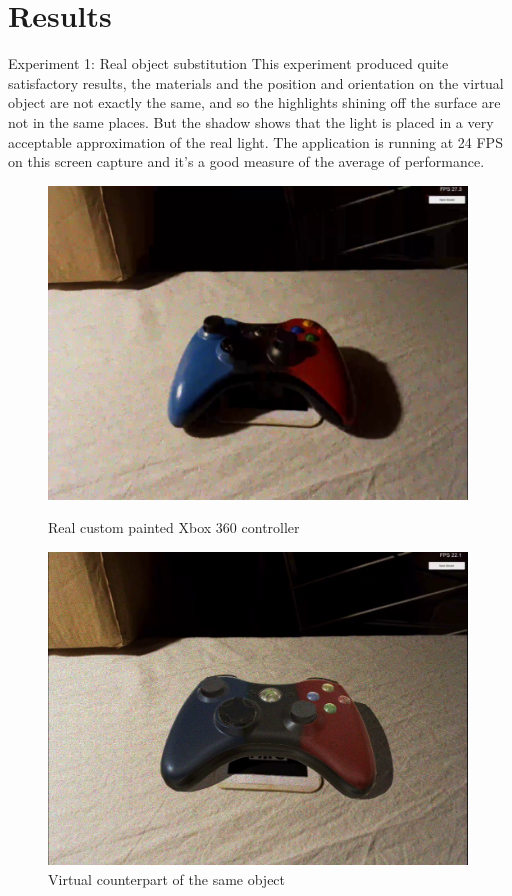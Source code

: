\section{Results}

Experiment 1: Real object substitution\newline  
This experiment produced quite satisfactory results, the materials and the position and orientation on the virtual object are not exactly the same, and so the highlights shining off the surface are not in the same places. But the shadow shows that the light is placed in a very acceptable approximation of the real light. The application is running at 24 FPS on this screen capture and it's a good measure of the average of performance. 
\begin{figure}[H]
    \centering
    \begin{minipage}{0.475\textwidth}
        \centering
        \includegraphics[width=0.99\textwidth]{Figures/ContReal.png} %
        \caption{Real custom painted Xbox 360 controller}
    \end{minipage}\hfill
    \begin{minipage}{0.475\textwidth}
        \centering
        \includegraphics[width=0.99\textwidth]{Figures/ContVirtual.png} %
        \caption{Virtual counterpart of the same object}
    \end{minipage}
\end{figure}

